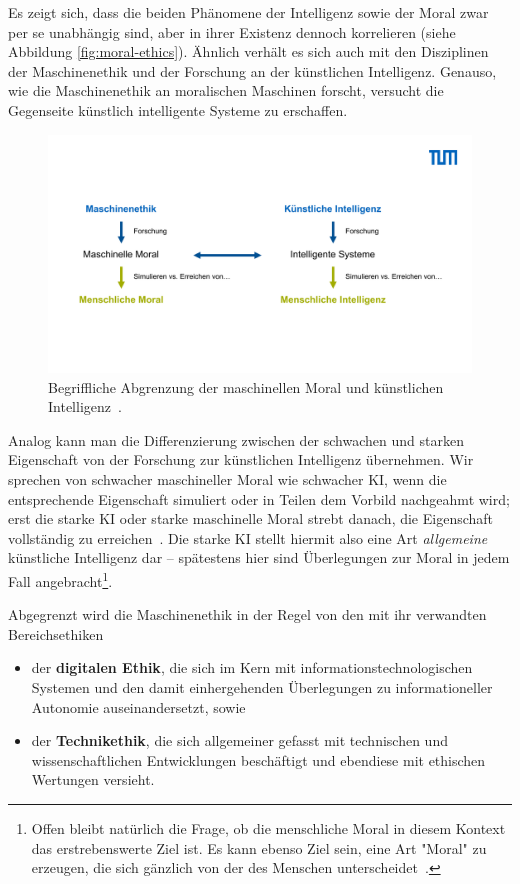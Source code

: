 \documentclass[twocolumn, german]{tum-article}
\begin{document}
Es zeigt sich, dass die beiden Phänomene der Intelligenz sowie der Moral zwar per se unabhängig sind, aber in ihrer Existenz dennoch korrelieren (siehe Abbildung \vref{fig:moral-ethics}).
Ähnlich verhält es sich auch mit den Disziplinen der Maschinenethik und der Forschung an der künstlichen Intelligenz.
Genauso, wie die Maschinenethik an moralischen Maschinen forscht, versucht die Gegenseite künstlich intelligente Systeme zu erschaffen.

\begin{figure}
	\includegraphics[width=\textwidth]{media/eth-int-pdf}
	\caption{Begriffliche Abgrenzung der maschinellen Moral und künstlichen Intelligenz~\cite[S. 17]{bendel-mascheth}.}
	\label{fig:moral-ethics}
\end{figure}

Analog kann man die Differenzierung zwischen der schwachen und starken Eigenschaft von der Forschung zur künstlichen Intelligenz übernehmen.
Wir sprechen von schwacher maschineller Moral wie schwacher KI, wenn die entsprechende Eigenschaft simuliert oder in Teilen dem Vorbild nachgeahmt wird; erst die starke KI oder starke maschinelle Moral strebt danach, die Eigenschaft vollständig zu erreichen~\cite[S. 17]{bendel-mascheth}.
Die starke KI stellt hiermit also eine Art \emph{allgemeine} künstliche Intelligenz dar -- spätestens hier sind Überlegungen zur Moral in jedem Fall angebracht\footnote{Offen bleibt natürlich die Frage, ob die menschliche Moral in diesem Kontext das erstrebenswerte Ziel ist. Es kann ebenso Ziel sein, eine Art "Moral" zu erzeugen, die sich gänzlich von der des Menschen unterscheidet~\cite[S. 23]{bendel-mascheth}.}.

Abgegrenzt wird die Maschinenethik in der Regel von den mit ihr verwandten Bereichsethiken
\begin{itemize}
	\item der \textbf{digitalen Ethik}, die sich im Kern mit informationstechnologischen Systemen und den damit einhergehenden Überlegungen zu informationeller Autonomie auseinandersetzt, sowie
	\item der \textbf{Technikethik}, die sich allgemeiner gefasst mit technischen und wissenschaftlichen Entwicklungen beschäftigt und ebendiese mit ethischen Wertungen versieht.
\end{itemize}
\end{document}
